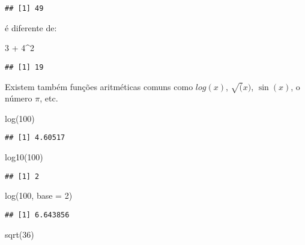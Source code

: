 \documentclass[
]{book}
\newenvironment{Shaded}{\begin{snugshade}}{\end{snugshade}}
\newcommand{\AttributeTok}[1]{\textcolor[rgb]{0.77,0.63,0.00}{#1}}
\newcommand{\DecValTok}[1]{\textcolor[rgb]{0.00,0.00,0.81}{#1}}
\newcommand{\FunctionTok}[1]{\textcolor[rgb]{0.00,0.00,0.00}{#1}}
\newcommand{\NormalTok}[1]{#1}
\newcommand{\SpecialCharTok}[1]{\textcolor[rgb]{0.00,0.00,0.00}{#1}}
\begin{document}
\begin{verbatim}
## [1] 49
\end{verbatim}

é diferente de:

\begin{Shaded}
\begin{Highlighting}[]
\DecValTok{3} \SpecialCharTok{+} \DecValTok{4}\SpecialCharTok{\^{}}\DecValTok{2}
\end{Highlighting}
\end{Shaded}

\begin{verbatim}
## [1] 19
\end{verbatim}

Existem também funções aritméticas comuns como \(log(x)\), \(\sqrt(x)\), \(\sin(x)\), o número \(\pi\), etc.

\begin{Shaded}
\begin{Highlighting}[]
\FunctionTok{log}\NormalTok{(}\DecValTok{100}\NormalTok{)}
\end{Highlighting}
\end{Shaded}

\begin{verbatim}
## [1] 4.60517
\end{verbatim}

\begin{Shaded}
\begin{Highlighting}[]
\FunctionTok{log10}\NormalTok{(}\DecValTok{100}\NormalTok{)}
\end{Highlighting}
\end{Shaded}

\begin{verbatim}
## [1] 2
\end{verbatim}

\begin{Shaded}
\begin{Highlighting}[]
\FunctionTok{log}\NormalTok{(}\DecValTok{100}\NormalTok{, }\AttributeTok{base =} \DecValTok{2}\NormalTok{)}
\end{Highlighting}
\end{Shaded}

\begin{verbatim}
## [1] 6.643856
\end{verbatim}

\begin{Shaded}
\begin{Highlighting}[]
\FunctionTok{sqrt}\NormalTok{(}\DecValTok{36}\NormalTok{)}
\end{Highlighting}
\end{Shaded}
\end{document}
